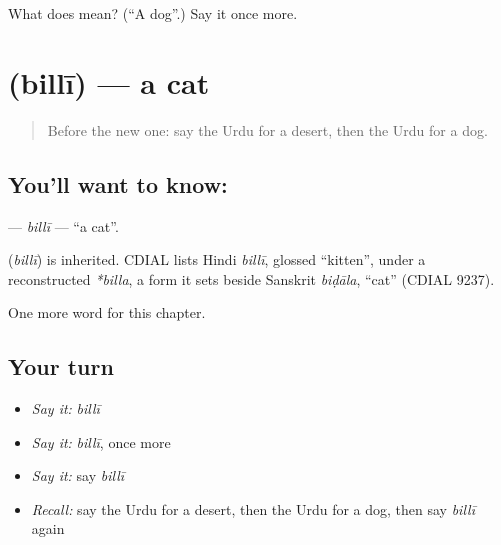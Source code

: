 \begin{tcolorbox}[breakable,colback=teal!4,colframe=teal!35!black,title={Before you move on}]
What does  mean? (\textquotedblleft{}A dog\textquotedblright{}.) Say it once more.
\end{tcolorbox}
\section[\texorpdfstring{\ur{بلی} (billī)}{بلی (billī)}]{ (billī) — a cat}

\label{lesson:UR-C67-billi}



\begin{quote}
Before the new one: say the Urdu for a desert, then the Urdu for a dog.
\end{quote}

\subsection*{You'll want to know: }
\textbf{} — \emph{billī} — \textquotedblleft{}a cat\textquotedblright{}.

\begin{cousinweb}
\textbf{} (\emph{billī}) is inherited. CDIAL lists Hindi \emph{billī}, glossed \textquotedblleft{}kitten\textquotedblright{}, under a reconstructed \emph{*billa}, a form it sets beside Sanskrit \emph{biḍāla}, \textquotedblleft{}cat\textquotedblright{} (CDIAL 9237).
\end{cousinweb}

\begin{grammarlens}[title={What you've built}]
One more word for this chapter.
\end{grammarlens}

\subsection*{Your turn}
\begin{itemize}
\raggedright
  \item \emph{Say it:} \emph{billī}
  \item \emph{Say it:} \emph{billī}, once more
  \item \emph{Say it:} say \emph{billī}
  \item \emph{Recall:} say the Urdu for a desert, then the Urdu for a dog, then say \emph{billī} again
\end{itemize}

